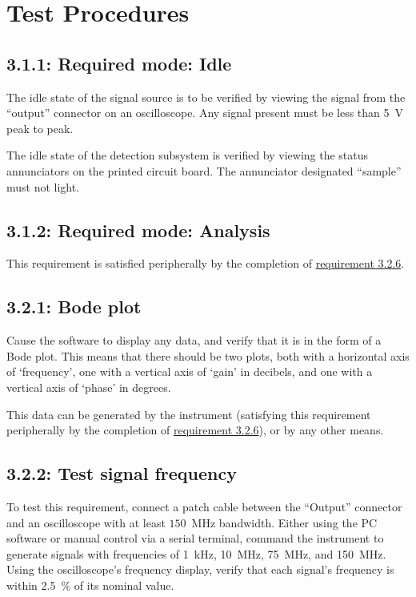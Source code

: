 \chapter{Test Procedures}
\label{chap:test}

\section*{3.1.1: Required mode: Idle}
The idle state of the signal source is to be verified by viewing the signal from the
``output'' connector on an oscilloscope. Any signal present must be less than 5~V peak to peak.

The idle state of the detection subsystem is verified by viewing the status annunciators on
the printed circuit board. The annunciator designated ``sample'' must not light.


\section*{3.1.2: Required mode: Analysis}
This requirement is satisfied peripherally by the completion of \hyperref[tp:3.2.6]{requirement 3.2.6}.

\section*{3.2.1: Bode plot}
\label{tp:3.2.1}
\label{tp:3.2.6}
Cause the software to display any data, and verify that it is in the form of a Bode plot.
This means that there should be two plots, both with a horizontal axis of `frequency',
one with a vertical axis of `gain' in decibels, and one with a vertical axis of `phase'
in degrees.

This data can be generated by the instrument (satisfying this requirement peripherally
by the completion of \hyperref[tp:3.2.6]{requirement 3.2.6}), or by any other means.

\section*{3.2.2: Test signal frequency}
\label{tp:3.2.2}
To test this requirement, connect a patch cable between the ``Output'' connector and an oscilloscope
with at least $150$~MHz bandwidth. Either using the PC software or manual control via a serial
terminal, command the instrument to generate signals with frequencies of 1~kHz, 10~MHz, 75~MHz,
and 150~MHz. Using the oscilloscope's frequency display, verify that each signal's frequency is
within 2.5~\% of its nominal value.

